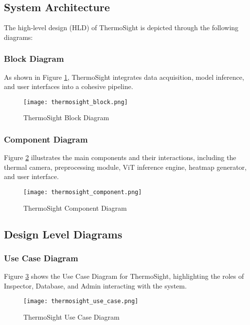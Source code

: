 \subsection{System Architecture}
The high‐level design (HLD) of ThermoSight is depicted through the following diagrams:

\subsubsection{Block Diagram}

As shown in Figure \ref{fig:ts_block}, ThermoSight integrates data acquisition, model inference, and user interfaces into a cohesive pipeline.

\begin{figure}[H]
    \centering
    \texttt{[image: thermosight\_block.png]}
    \caption{ThermoSight Block Diagram}
    \label{fig:ts_block}
\end{figure}
\medskip

\subsubsection{Component Diagram}

Figure \ref{fig:ts_component} illustrates the main components and their interactions, including the thermal camera, preprocessing module, ViT inference engine, heatmap generator, and user interface.

\begin{figure}[H]
    \centering
    \texttt{[image: thermosight\_component.png]}
    \caption{ThermoSight Component Diagram}
    \label{fig:ts_component}
\end{figure}

\subsection{Design Level Diagrams}

\subsubsection{Use Case Diagram}

Figure \ref{fig:ts_use_case} shows the Use Case Diagram for ThermoSight, highlighting the roles of Inspector, Database, and Admin interacting with the system.

\begin{figure}[H]
    \centering
    \texttt{[image: thermosight\_use\_case.png]}
    \caption{ThermoSight Use Case Diagram}
    \label{fig:ts_use_case}
\end{figure}

